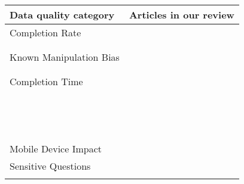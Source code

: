 \begin{table}
	\centering
	\begin{tabular}{ll}
		\toprule
		Data quality category & Articles in our review\\
		\midrule
    	Completion Rate & \cite{ha_are_2019, ha_data_2020}\\
    	& \cite{mavletova_data_2013, mavletova_grid_2018}\\
    	& \cite{ buskirk_making_2014, mavletova_sensitive_2013}\\
        Known Manipulation Bias & \cite{wells_comparison_2014, hartman_does_2019}\\
    	& \cite{peytchev_experiments_2010, tourangeau_web_2017}\\
    	& \cite{keusch_web_2017}\\
        Completion Time & \cite{revilla_are_2017, ha_are_2019}\\
    	& \cite{revilla_are_2017, de_bruijne_comparing_2013}\\
    	& \cite{weigold_computerized_2021, ha_data_2020}\\
    	& \cite{mavletova_data_2013, hartman_does_2019}\\
    	& \cite{liebe_does_2015, antoun_effects_2017}\\
    	& \cite{lee_experimental_2019, gummer_explaining_2015}\\
    	& \cite{antoun_factors_2020, mavletova_grid_2018}\\
    	& \cite{lambert_living_2015, buskirk_making_2014}\\
    	& \cite{schlosser_mobile_2018, zou_mobile_2021}\\
    	& \cite{daikeler_motivated_2020, revilla_open_2016}\\
    	& \cite{skeie_smartphone_2019, revilla_testing_2018}\\
    	& \cite{huff_comparison_2015, mason_effect_2019}\\
    	& \cite{struminskaya_effects_2015, lugtig_use_2016}\\
    	& \cite{tourangeau_web_2018, keusch_web_2017}\\
    	& \cite{toepoel_what_2014, couper_why_2017}\\
        Mobile Device Impact & \cite{schlosser_mobile_2018, mavletova_mobile_2014}\\
        Sensitive Questions & \cite{lee_experimental_2019, mavletova_sensitive_2013}\\
    	& \cite{toninelli_smartphones_2016}\\

\end{tabular}
\end{table}
